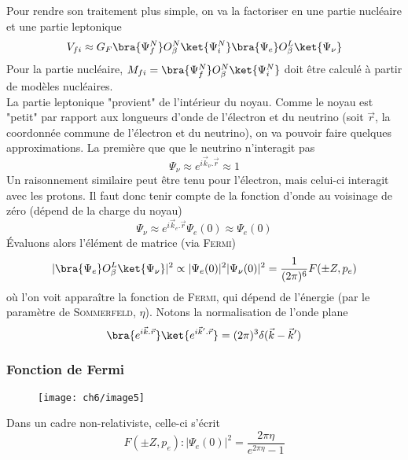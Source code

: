 Pour rendre son traitement plus simple, on va la factoriser en une partie nucléaire et une partie leptonique
\begin{equation}
V_{fi} \approx G_F \bra{\Psi_f^N}O^N_\beta\ket{\Psi_i^N}\bra{\Psi_e}O^L_\beta\ket{\Psi_\nu}
\end{equation}
Pour la partie nucléaire, $M_{fi} = \bra{\Psi_f^N}O^N_\beta\ket{\Psi_i^N}$ doit être calculé à partir de 
modèles nucléaires.\\

La partie leptonique "provient" de l'intérieur du noyau. Comme le noyau est "petit" par rapport aux longueurs 
d'onde de l'électron et du neutrino (soit $\vec{r}$, la coordonnée commune de l'électron et du neutrino), on va
pouvoir faire quelques approximations. La première que que le neutrino n'interagit pas
\begin{equation}
\Psi_\nu \approx e^{i\vec{k}_\nu.\vec{r}}\approx1
\end{equation}
Un raisonnement similaire peut être tenu pour l'électron, mais celui-ci interagit avec les protons. Il faut donc
tenir compte de la fonction d'onde au voisinage de zéro (dépend de la charge du noyau)
\begin{equation}
\Psi_\nu \approx e^{i\vec{k}_e.\vec{r}}\Psi_e(0)\approx\Psi_e(0)
\end{equation}
Évaluons alors l'élément de matrice (via \textsc{Fermi})
\begin{equation}
|\bra{\Psi_e}O^L_\beta\ket{\Psi_\nu}|^2 \propto |\Psi_e(0)|^2|\Psi_\nu(0)|^2 = \frac{1}{(2\pi)^6}F(\pm Z, p_e)
\end{equation}
où l'on voit apparaître la fonction de \textsc{Fermi}, qui dépend de l'énergie (par le paramètre de 
\textsc{Sommerfeld}, $\eta$). Notons la normalisation de l'onde plane
\begin{equation}
\bra{e^{i\vec k.\vec r}}\ket{e^{i\vec k'.\vec r}} = (2\pi)^3\delta(\vec{k}-\vec{k}')
\end{equation}

\subsubsection{Fonction de Fermi}
	\begin{wrapfigure}[14]{l}{10.5cm}
	\vspace{-5mm}
	\texttt{[image: ch6/image5]}
	\end{wrapfigure}
	
Dans un cadre non-relativiste, celle-ci s'écrit
\begin{equation}
F(\pm Z, p_e) : |\Psi_e(0)|^2 = \dfrac{2\pi\eta}{e^{2\pi\eta}-1}
\end{equation}\ \\
\\
\\

